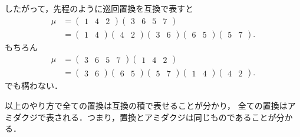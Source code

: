 したがって，先程のように巡回置換を互換で表すと
\[
\begin{split}
     \mu&=\begin{pmatrix}1&4&2\end{pmatrix}
     \begin{pmatrix}3&6&5&7\end{pmatrix}\\
     &=\begin{pmatrix}1&4\end{pmatrix}
     \begin{pmatrix}4&2\end{pmatrix}
     \begin{pmatrix}3&6\end{pmatrix}
     \begin{pmatrix}6&5\end{pmatrix}
     \begin{pmatrix}5&7\end{pmatrix}.
\end{split}
\]
もちろん
\[
\begin{split}
     \mu&=
     \begin{pmatrix}3&6&5&7\end{pmatrix}
     \begin{pmatrix}1&4&2\end{pmatrix}
     \\
     &=
     \begin{pmatrix}3&6\end{pmatrix}
     \begin{pmatrix}6&5\end{pmatrix}
     \begin{pmatrix}5&7\end{pmatrix}
     \begin{pmatrix}1&4\end{pmatrix}
     \begin{pmatrix}4&2\end{pmatrix}.
\end{split}
\]
でも構わない．

以上のやり方で全ての置換は互換の積で表せることが分かり，
全ての置換はアミダクジで表される．つまり，置換とアミダクジは同じものであることが分かる．

